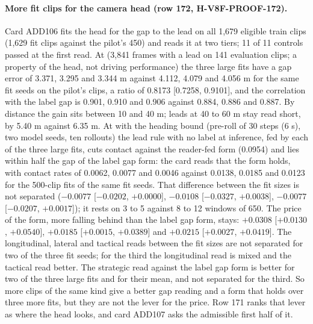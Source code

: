 \paragraph{More fit clips for the camera head (row 172, H-V8F-PROOF-172).} Card ADD106 fits the head for the gap to the lead on all 1,679 eligible train clips (1,629 fit clips against the pilot's 450) and reads it at two tiers; 11 of 11 controls passed at the first read. At  (3,841 frames with a lead on 141 evaluation clips; a property of the head, not driving performance) the three large fits have a gap error of 3.371, 3.295 and 3.344 m against 4.112, 4.079 and 4.056 m for the same fit seeds on the pilot's clips, a ratio of 0.8173 [0.7258, 0.9101], and the correlation with the label gap is 0.901, 0.910 and 0.906 against 0.884, 0.886 and 0.887. By distance the gain sits between 10 and 40 m; leads at 40 to 60 m stay read short, by 5.40 m against 6.35 m. At  with the heading bound (pre-roll of 30 steps (6 s), two model seeds, ten rollouts) the lead rule with no label at inference, fed by each of the three large fits, cuts contact against the reader-fed form (0.0954) and lies within half the gap of the label gap form: the card reads that the form holds, with contact rates of 0.0062, 0.0077 and 0.0046 against 0.0138, 0.0185 and 0.0123 for the 500-clip fits of the same fit seeds. That difference between the fit sizes is not separated ($-0.0077$ [$-0.0202$, $+0.0000$], $-0.0108$ [$-0.0327$, $+0.0038$], $-0.0077$ [$-0.0207$, $+0.0017$]); it rests on 3 to 5 against 8 to 12 windows of 650. The price of the form, more falling behind than the label gap form, stays: $+0.0308$ [$+0.0130$, $+0.0540$], $+0.0185$ [$+0.0015$, $+0.0389$] and $+0.0215$ [$+0.0027$, $+0.0419$]. The longitudinal, lateral and tactical reads between the fit sizes are not separated for two of the three fit seeds; for the third the longitudinal read is mixed and the tactical read better. The strategic read against the label gap form is better for two of the three large fits and for their mean, and not separated for the third. So more clips of the same kind give a better gap reading and a form that holds over three more fits, but they are not the lever for the price. Row 171 ranks that lever as where the head looks, and card ADD107 asks the admissible first half of it.

